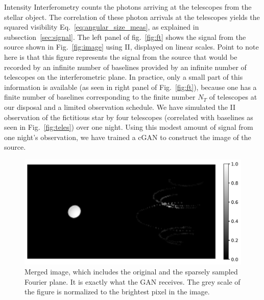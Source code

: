 Intensity Interferometry counts the photons arriving at the telescopes from the stellar object. The correlation of these photon arrivals at the telescopes yields the squared visibility Eq.~\eqref{eq:angular_size_meas}, as explained in subsection~\ref{sec:signal}. The left panel of fig.~\ref{fig:ft} shows the signal from the source shown in Fig.~\ref{fig:image} using II, displayed on linear scales. Point to note here is that this figure represents the signal from the source that would be recorded by an infinite number of baselines provided by an infinite number of telescopes on the interferometric plane. In practice, only a small part of this information is available (as seen in right panel of Fig.~\ref{fig:ft}), because one has a finite number of baselines corresponding to the finite number $N_T$ of telescopes at our disposal and a limited observation schedule. We have simulated the II observation of the fictitious star by four telescopes (correlated with baselines as seen in Fig.~\ref{fig:teles}) over one night. Using this modest amount of signal from one night's observation, we have trained a cGAN to construct the image of the source.
\begin{figure}
   \centering
  \includegraphics[width=0.85\linewidth]{fig/ellipse1612.jpg}
  \caption{Merged image, which includes the original and the sparsely sampled Fourier plane. It is exactly what the GAN receives. The grey scale of the figure is normalized to the brightest pixel in the image.}
  \label{fig:GANinput}
\end{figure}
